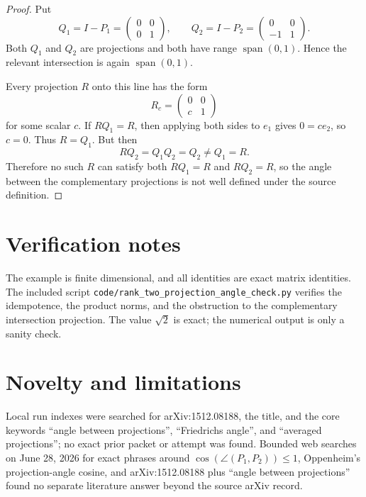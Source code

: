 \documentclass[11pt]{article}
\begin{document}
\begin{proof}
Put
\[
Q_1=I-P_1=
\begin{pmatrix}
0&0\\
0&1
\end{pmatrix},
\qquad
Q_2=I-P_2=
\begin{pmatrix}
0&0\\
-1&1
\end{pmatrix}.
\]
Both \(Q_1\) and \(Q_2\) are projections and both have range
\(\operatorname{span}(0,1)\).  Hence the relevant intersection is again
\(\operatorname{span}(0,1)\).

Every projection \(R\) onto this line has the form
\[
R_c=
\begin{pmatrix}
0&0\\
c&1
\end{pmatrix}
\]
for some scalar \(c\).  If \(RQ_1=R\), then applying both sides to \(e_1\)
gives \(0=ce_2\), so \(c=0\).  Thus \(R=Q_1\).  But then
\[
RQ_2=Q_1Q_2=Q_2\neq Q_1=R.
\]
Therefore no such \(R\) can satisfy both \(RQ_1=R\) and \(RQ_2=R\), so the
angle between the complementary projections is not well defined under the
source definition.
\end{proof}

\section{Verification notes}

The example is finite dimensional, and all identities are exact matrix
identities.  The included script
\texttt{code/rank\_two\_projection\_angle\_check.py} verifies the idempotence,
the product norms, and the obstruction to the complementary intersection
projection.  The value \(\sqrt2\) is exact; the numerical output is only a
sanity check.

\section{Novelty and limitations}

Local run indexes were searched for arXiv:1512.08188, the title, and the core
keywords ``angle between projections'', ``Friedrichs angle'', and ``averaged
projections''; no exact prior packet or attempt was found.  Bounded web
searches on June 28, 2026 for exact phrases around
\(\cos(\angle(P_1,P_2))\leq 1\), Oppenheim's projection-angle cosine, and
arXiv:1512.08188 plus ``angle between projections'' found no separate
literature answer beyond the source arXiv record.
\end{document}
